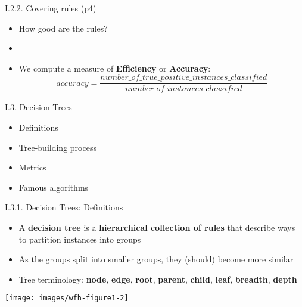 \documentclass[handout]{beamer}
\newcommand{\strong}[1]{\textbf{\color{teal} #1}}
\newcommand{\stronger}[1]{\textbf{\color{purple} #1}}
\begin{document}
\begin{frame}{I.2.2. Covering rules (p4)}
\begin{itemize}
\item How good are the rules?
\item[] 
\item We compute a measure of \stronger{Efficiency} or \stronger{Accuracy}:
\[
\mathit{accuracy} = \frac{\mathit{number\_of\_true\_positive\_instances\_classified}}{\mathit{number\_of\_instances\_classified}}
\]
\end{itemize}
\end{frame}
\begin{frame}{I.3. Decision Trees}
\begin{itemize}
\item[I.3.1] Definitions
\item[I.3.2] Tree-building process
\item[I.3.3] Metrics
\item[I.3.4] Famous algorithms
\end{itemize}
\end{frame}
\begin{frame}{I.3.1. Decision Trees: Definitions}
\begin{itemize}
\item A \stronger{decision tree} is a \strong{hierarchical collection of rules} that describe ways to partition instances into groups
\item As the groups split into smaller groups, they (should) become more similar
\item Tree terminology: \strong{node}, \strong{edge}, \strong{root}, \strong{parent}, \strong{child}, \strong{leaf}, \strong{breadth}, \strong{depth}
\end{itemize}
\begin{center}
\texttt{[image: images/wfh-figure1-2]}\\
\cite[Fig 1.2]{WFH3:2011}
\end{center}
\end{frame}
\end{document}

